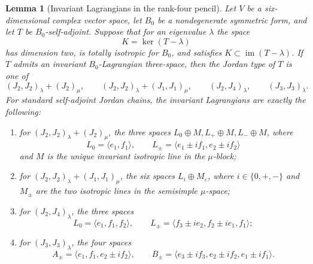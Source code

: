 \documentclass[11pt,reqno]{amsart}
\newtheorem{lemma}[theorem]{Lemma}
\theoremstyle{remark}
\begin{document}
\begin{lemma}[Invariant Lagrangians in the rank-four pencil]\label{lem:r36lagrangian}
Let $V$ be a six-dimensional complex vector space, let $B_0$ be a nondegenerate symmetric form, and let $T$ be $B_0$-self-adjoint.  Suppose that for an eigenvalue $\lambda$ the space
\[
K=\ker(T-\lambda)
\]
has dimension two, is totally isotropic for $B_0$, and satisfies $K\subset\operatorname{im}(T-\lambda)$.  If $T$ admits an invariant $B_0$-Lagrangian three-space, then the Jordan type of $T$ is one of
\[
(J_2,J_2)_\lambda+(J_2)_\mu,\qquad
(J_2,J_2)_\lambda+(J_1,J_1)_\mu,\qquad
(J_2,J_4)_\lambda,\qquad
(J_3,J_3)_\lambda. \tag{LJ}\label{eq:lagjordan}
\]
For standard self-adjoint Jordan chains, the invariant Lagrangians are exactly the following:
\begin{enumerate}[label=(\alph*)]
\item for $(J_2,J_2)_\lambda+(J_2)_\mu$, the three spaces $L_0\oplus M,L_+\oplus M,L_-\oplus M$, where
\[
L_0=\langle e_1,f_1\rangle,\qquad
L_\pm=\langle e_1\pm i f_1,e_2\pm i f_2\rangle
\]
and $M$ is the unique invariant isotropic line in the $\mu$-block;
\item for $(J_2,J_2)_\lambda+(J_1,J_1)_\mu$, the six spaces $L_i\oplus M_\varepsilon$, where $i\in\{0,+,-\}$ and $M_\pm$ are the two isotropic lines in the semisimple $\mu$-space;
\item for $(J_2,J_4)_\lambda$, the three spaces
\[
L_0=\langle e_1,f_1,f_2\rangle,\qquad
L_\pm=\langle f_3\pm i e_2,f_2\pm i e_1,f_1\rangle;
\]
\item for $(J_3,J_3)_\lambda$, the four spaces
\[
A_\pm=\langle e_1,f_1,e_2\pm i f_2\rangle,
\qquad
B_\pm=\langle e_3\pm i f_3,e_2\pm i f_2,e_1\pm i f_1\rangle.
\]
\end{enumerate}
\end{lemma}
\end{document}
